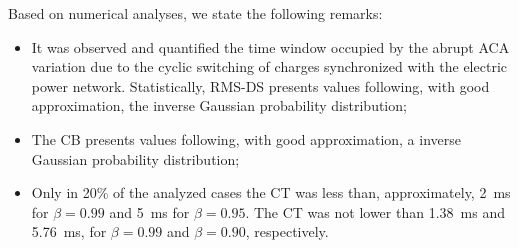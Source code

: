 \documentclass[journal]{IEEEtran}
\begin{document}
Based on numerical analyses, we state the following remarks:
\begin{itemize}
	\item It was observed and quantified the time window occupied by the abrupt \ac{ACA} variation due to the cyclic switching of charges synchronized with the electric power network. Statistically, \ac{RMS-DS} presents values following, with good approximation, the inverse Gaussian probability distribution; 
	\item The \ac{CB} presents values following, with good approximation, a inverse Gaussian probability distribution;
	\item Only in 20\% of the analyzed cases the \ac{CT} was less than, approximately, 2~ms for $\beta = 0.99$ and 5~ms for $\beta = 0.95$. The \ac{CT} was not lower than 1.38~ms and 5.76~ms, for $\beta=0.99$ and $\beta = 0.90$, respectively.
\end{itemize}

\end{document}
